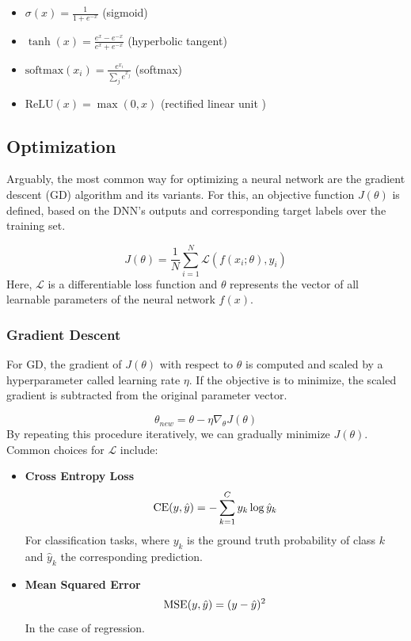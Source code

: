 \begin{itemize}
    \item $\sigma(x) = \frac{1}{1 + e^{-x}}$ (sigmoid)
    \item $\tanh(x) = \frac{e^x - e^{-x}}{e^x + e^{-x}}$ (hyperbolic tangent)
    \item $\text{softmax}(x_i) = \frac{e^{x_i}}{\sum_j e^{x_j}}$ (softmax)
    \item $\text{ReLU}(x) = \max(0, x)$ (rectified linear unit \cite{nair2010rectified})
\end{itemize}

\subsection{Optimization}
Arguably, the most common way for optimizing a neural network are the gradient descent (GD) algorithm and its variants. For this, an objective function $J(\theta)$ is defined, based on the DNN's outputs and corresponding target labels over the training set.

\begin{equation}
    J(\theta) = \frac{1}{N} \sum_{i=1}^{N} \mathcal{L}(f(x_i; \theta), y_i)
\end{equation}
Here, $\mathcal{L}$ is a differentiable loss function and $\theta$ represents the vector of all learnable parameters of the neural network $f(x)$.

\subsubsection{Gradient Descent}
For GD, the gradient of $J(\theta)$ with respect to $\theta$ is computed and scaled by a hyperparameter called learning rate $\eta$. If the objective is to minimize, the scaled gradient is subtracted from the original parameter vector.

\begin{equation}
    \theta_{new} = \theta - \eta\nabla_\theta J(\theta)
\end{equation}
By repeating this procedure iteratively, we can gradually minimize $J(\theta)$. Common choices for $\mathcal{L}$ include:
\begin{itemize}
    \item \textbf{Cross Entropy Loss}
          \begin{equation}
              \label{eq:ce_loss}
              \text{CE}(y, \hat{y}) = - \sum_{k=1}^C y_k \log \hat{y}_k
          \end{equation}
          For classification tasks, where $y_k$ is the ground truth probability of class $k$ and $\hat{y}_k$ the corresponding prediction.

    \item \textbf{Mean Squared Error}
          \begin{equation}
              \text{MSE}(y, \hat{y}) = (y - \hat{y})^2
          \end{equation}
          In the case of regression.
\end{itemize}

